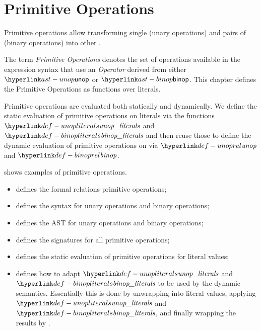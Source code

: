 \chapter{Primitive Operations\label{chap:PrimitiveOperations}}

Primitive operations allow transforming single \nativevaluesterm{} (unary operations)
and pairs of \nativevaluesterm{} (binary operations) into other \nativevaluesterm{}.

The term \emph{Primitive Operations} denotes the set of operations available
in the expression syntax that use an \emph{Operator} derived from either
$\unop$ or $\binop$.
This chapter defines the Primitive Operations as functions over literals.

Primitive operations are evaluated both statically and dynamically.
We define the static evaluation of primitive operations on literals
via the functions $\unopliterals$ and $\binopliterals$ and then reuse
those to define the dynamic evaluation of primitive operations
on \nativevaluesterm{} via $\unoprel$ and $\binoprel$.

 shows examples of primitive operations.

\ChapterOutline
\begin{itemize}
  \item {} defines the formal relations
        primitive operations;
  \item {} defines the syntax for unary operations and binary operations;
  \item {} defines the AST for unary operations and binary operations;
  \item {} defines the signatures for all primitive operations;
  \item {} defines the static evaluation of primitive operations for literal values;
  \item {} defines how to adapt $\unopliterals$
        and $\binopliterals$ to be used by the dynamic semantics. Essentially this is done by unwrapping
        \nativevaluesterm{} into literal values, applying $\unopliterals$ and $\binopliterals$,
        and finally wrapping the results by \nativevaluesterm{}.
\end{itemize}

